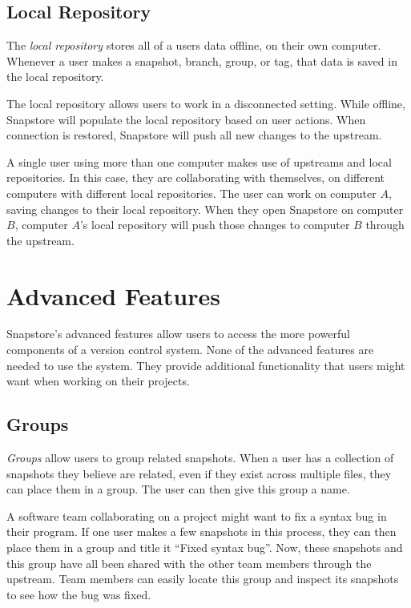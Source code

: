 \subsection{Local Repository}

The \textit{local repository} stores all of a users data offline, on their own computer. Whenever a user makes a snapshot, branch, group, or tag, that data is saved in the local repository.

The local repository allows users to work in a disconnected setting. While offline, Snapstore will populate the local repository based on user actions. When connection is restored, Snapstore will push all new changes to the upstream.

A single user using more than one computer makes use of upstreams and local repositories. In this case, they are collaborating with themselves, on different computers with different local repositories. The user can work on computer $A$, saving changes to their local repository. When they open Snapstore on computer $B$, computer $A$'s local repository will push those changes to computer $B$ through the upstream.

\section{Advanced Features}

Snapstore's advanced features allow users to access the more powerful components of a version control system. None of the advanced features are needed to use the system. They provide additional functionality that users might want when working on their projects.

\subsection{Groups}

\textit{Groups} allow users to group related snapshots. When a user has a collection of snapshots they believe are related, even if they exist across multiple files, they can place them in a group. The user can then give this group a name.

A software team collaborating on a project might want to fix a syntax bug in their program. If one user makes a few snapshots in this process, they can then place them in a group and title it ``Fixed syntax bug''. Now, these snapshots and this group have all been shared with the other team members through the upstream. Team members can easily locate this group and inspect its snapshots to see how the bug was fixed. 

